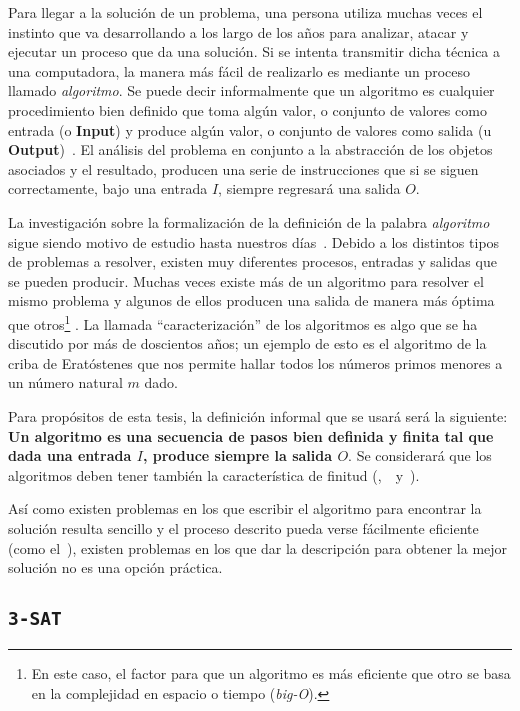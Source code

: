 Para llegar a la solución de un problema, una persona utiliza muchas veces
el instinto que va desarrollando a los largo de los años para analizar,
atacar y ejecutar un proceso que da una solución. Si se intenta
transmitir dicha técnica a una computadora, la manera más fácil de realizarlo
es mediante un proceso llamado \textit{algoritmo}.
Se puede decir informalmente que un algoritmo es cualquier procedimiento bien
definido que toma algún valor, o conjunto de valores como entrada
(o \textbf{Input}) y produce algún valor, o conjunto de valores como
salida (u \textbf{Output})~\cite{Cormen}. El análisis del problema en conjunto
a la abstracción de los objetos asociados y el resultado, producen
una serie de instrucciones que si se siguen correctamente, bajo una entrada
$I$, siempre regresará una salida $O$.

La investigación sobre la formalización de la definición de la palabra
\textit{algoritmo} sigue siendo motivo de estudio hasta nuestros días~\cite{Buss}.
Debido a los distintos tipos de problemas a resolver, existen muy diferentes
procesos, entradas y salidas que se pueden producir. Muchas veces existe más
de un algoritmo para resolver el mismo problema y algunos de ellos producen una
salida de manera más óptima que otros\footnote{En este caso, el factor para
que un algoritmo es más eficiente que otro se basa en la complejidad
en espacio o tiempo (\textit{big-O}).} . La llamada ``caracterización'' de los algoritmos
es algo que se ha discutido por más de doscientos años; un ejemplo de esto
es el algoritmo de la criba de Eratóstenes que nos permite hallar todos los
números primos menores a un número natural $m$ dado.

Para propósitos de esta tesis, la definición informal que se usará será la
siguiente: \textbf{Un algoritmo es una secuencia de pasos bien definida y finita
  tal que dada una entrada $I$, produce siempre la salida $O$}. Se considerará
que los algoritmos deben tener también la característica de finitud
(\cite{Physics},~\cite{Rogers1967}~y~\cite{Cormen}).

Así como existen problemas en los que escribir el algoritmo para encontrar
la solución resulta sencillo y el proceso descrito pueda verse fácilmente
eficiente (como el~), existen problemas en los que
dar la descripción para obtener la mejor solución no es una opción práctica.

\subsection{\texttt{3-SAT}}

